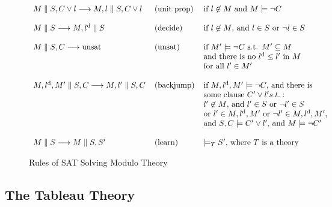 \begin{figure}[t]
\parbox{\textwidth}
{\small
\begin{center}
$\begin{array}{l@{\hspace{0.4cm}}l@{\hspace{0.4cm}}l}
M\parallel{}S,C\lor{}l\longrightarrow{}M,l\parallel{}S,C\lor{}l &
(\mathrm{unit~prop}) & \mbox{if }l\not\in{}M\mbox{ and }M\models{}\neg{}C\\\\

M\parallel{}S\longrightarrow{}M,l^\mathrm{d}\parallel{}S & (\mathrm{decide}) &
\mbox{if }l\not\in{}M\mbox{, and }l\in{}S\mbox{ or }\neg{}l\in{}S\\\\

M\parallel{}S,C\longrightarrow\mathrm{unsat} & (\mathrm{unsat}) &
\mbox{if }M'\models{}\neg{}C\mbox{ s.t. }M'\subseteq{}M\\
&& \mbox{and there is no }l^\mathrm{d}\leq{}l'\mbox{ in }M\\
&& \mbox{for all }l'\in{}M'\\\\
 
M,l^\mathrm{d},M'\parallel{}S,C\longrightarrow{}M,l'\parallel{}S,C &
(\mathrm{backjump}) & \mbox{if }M,l^\mathrm{d},M'\models\neg{}C
\mbox{, and there is}\\
&& \mbox{some clause }C'\lor{}l' s.t.:\\
&& l'\not\in{}M\mbox{, and }l'\in{}S\mbox{ or }\neg{}l'\in{}S\\
&& \mbox{or }l'\in{}M,l^\mathrm{d},M'\mbox{ or }
\neg{}l'\in{}M,l^\mathrm{d},M',\\
&& \mbox{and }S,C\models{}C'\lor{}l'\mbox{, and }M\models\neg{}C'\\\\

M\parallel{}S\longrightarrow{}M\parallel{}S,S'
& (\mathrm{learn}) & \models_TS'\mbox{, where }T\mbox{ is a theory}
\end{array}$
\end{center}}
\caption{Rules of SAT Solving Modulo Theory}
\label{fig:smt}
\end{figure}

\subsection{The Tableau Theory}

